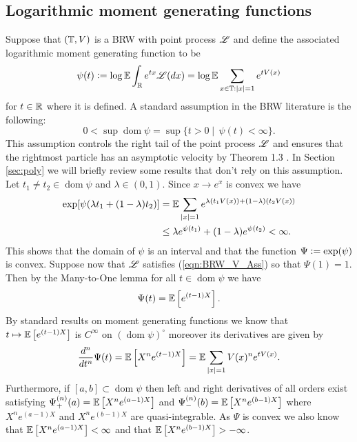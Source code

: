 \subsection{Logarithmic moment generating functions}\label{subsec:moment_generating_functions}
Suppose that $(\mathbb{T}, V)$ is a BRW with point process $\mathscr{L}$ and define the associated logarithmic moment generating function to be
\begin{equation}\nonumber
\psi(t) \vcentcolon= \log \mathbb{E} \int_{\mathbb{R}} e^{t x} \mathscr{L}(dx) = \log \mathbb{E} \sum\limits_{x \in \mathbb{T}: |x|=1} e^{t V(x)} 
\end{equation}
for $t \in \mathbb{R}$ where it is defined. A standard assumption in the BRW literature is the following: 
\begin{equation}\label{eqn:BRW_generator_finite}
0 < \sup\operatorname*{dom} \psi = \sup\{ t > 0 \mid\, \psi(t) < \infty \}. 
\end{equation}
This assumption controls the right tail of the point process $\mathscr{L}$ and ensures that the rightmost particle has an asymptotic velocity by Theorem 1.3 \cite{shi2015branching}. In Section \ref{sec:poly} we will briefly review some results that don't rely on this assumption. Let $t_1 \neq t_2 \in \operatorname*{dom} \psi$ and $\lambda \in (0, 1)$. Since $x \to e^x$ is convex we have
\begin{align*}
\exp [\psi(\lambda t_1 + (1 - \lambda) t_2)] &= \mathbb{E} \sum\limits_{|x| = 1} e^{\lambda (t_1 V(x))+ (1 - \lambda) (t_2 V(x))} \\
									  &\leq	\lambda e^{\psi(t_1)} + (1 - \lambda)e^{\psi(t_2)} < \infty. 
\end{align*} 
This shows that the domain of $\psi$ is an interval and that the function $\Psi \vcentcolon= \exp(\psi)$ is convex. Suppose now that $\mathscr{L}$ satisfies (\ref{eqn:BRW_V_Ass}) so that $\Psi(1) = 1$. Then by the Many-to-One lemma for all $t \in \operatorname*{dom} \psi$ we have
\begin{equation}\nonumber
\Psi(t) = \mathbb{E}\left[ e^{(t - 1)X} \right]. 
\end{equation}
By standard results on moment generating functions we know that $t \mapsto \mathbb{E}\left[ e^{(t - 1)X} \right]$ is $C^\infty$ on $(\operatorname*{dom} \psi)^\circ$ moreover
its derivatives are given by 
\begin{equation}\nonumber
\frac{d^n}{dt^n} \Psi(t) = \mathbb{E}\left[ X^n e^{(t - 1)X} \right] = \mathbb{E} \sum\limits_{|x| = 1} V(x)^n e^{t V(x)}. 
\end{equation}
Furthermore, if $[a, b] \subset \operatorname*{dom} \psi$ then left and right derivatives of all orders exist satisfying $\Psi^{(n)}_+(a) = \mathbb{E}\left[ X^n e^{(a - 1)X} \right]$ and $\Psi^{(n)}_-(b) = \mathbb{E}\left[ X^n e^{(b - 1)X} \right]$ where $X^n e^{(a - 1)X}$ and $X^n e^{(b - 1)X}$ are quasi-integrable. As $\Psi$ is convex we also know that ${\mathbb{E}\left[ X^n e^{(a - 1)X} \right] < \infty}$ and that $\mathbb{E}\left[ X^n e^{(b - 1)X} \right] > -\infty$. 





